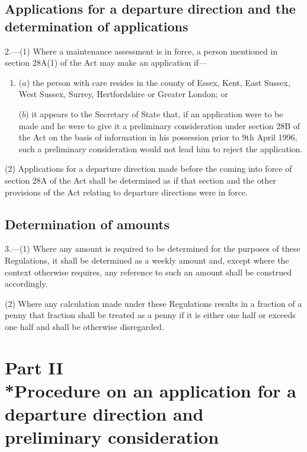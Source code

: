 \documentclass[a4paper]{article}
\begin{document}
\subsection[2. Applications for a departure direction and the determination of applications]{Applications for a departure direction and the determination of applications}

2.—(1) Where a maintenance assessment is in force, a person mentioned in section 28A(1) of the Act may make an application if—
\begin{enumerate}\item[]
($a$) the person with care resides in the county of Essex, Kent, East Sussex, West Sussex, Surrey, Hertfordshire or Greater London; or

($b$) it appears to the Secretary of State that, if an application were to be made and he were to give it a preliminary consideration under section 28B of the Act on the basis of information in his possession prior to 9th April 1996, such a preliminary consideration would not lead him to reject the application.
\end{enumerate}

(2) Applications for a departure direction made before the coming into force of section 28A of the Act shall be determined as if that section and the other provisions of the Act relating to departure directions were in force.

\subsection[3. Determination of amounts]{Determination of amounts}

3.—(1) Where any amount is required to be determined for the purposes of these Regulations, it shall be determined as a weekly amount and, except where the context otherwise requires, any reference to such an amount shall be construed accordingly.

(2) Where any calculation made under these Regulations results in a fraction of a penny that fraction shall be treated as a penny if it is either one half or exceeds one half and shall be otherwise disregarded.

\section[Part II --- Procedure on an application for a departure direction and preliminary consideration]{Part II\\*Procedure on an application for a departure direction and preliminary consideration}
\end{document}
